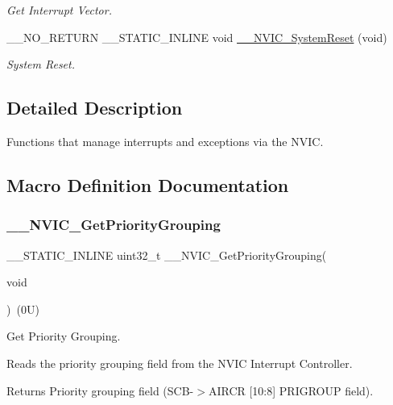 \begin{DoxyCompactItemize}
\begin{DoxyCompactList}\small\item\em Get Interrupt Vector. \end{DoxyCompactList}\item 
\+\_\+\+\_\+\+N\+O\+\_\+\+R\+E\+T\+U\+RN \+\_\+\+\_\+\+S\+T\+A\+T\+I\+C\+\_\+\+I\+N\+L\+I\+NE void \mbox{\hyperlink{group___c_m_s_i_s___core___n_v_i_c_functions_ga0d9aa2d30fa54b41eb780c16e35b676c}{\+\_\+\+\_\+\+N\+V\+I\+C\+\_\+\+System\+Reset}} (void)
\begin{DoxyCompactList}\small\item\em System Reset. \end{DoxyCompactList}\end{DoxyCompactItemize}


\subsection{Detailed Description}
Functions that manage interrupts and exceptions via the N\+V\+IC. 



\subsection{Macro Definition Documentation}
\mbox{\label{group___c_m_s_i_s___core___n_v_i_c_functions_gae1de06155d072758b3453edb07d12459}} 
\subsubsection{\texorpdfstring{\_\_NVIC\_GetPriorityGrouping}{\_\_NVIC\_GetPriorityGrouping}}
{\footnotesize\ttfamily \+\_\+\+\_\+\+S\+T\+A\+T\+I\+C\+\_\+\+I\+N\+L\+I\+NE uint32\+\_\+t \+\_\+\+\_\+\+N\+V\+I\+C\+\_\+\+Get\+Priority\+Grouping(\begin{DoxyParamCaption}\item[{}]{void }\end{DoxyParamCaption})~(0\+U)}



Get Priority Grouping. 

Reads the priority grouping field from the N\+V\+IC Interrupt Controller. \begin{DoxyReturn}{Returns}
Priority grouping field (S\+C\+B-\/$>$A\+I\+R\+CR \mbox{[}10\+:8\mbox{]} P\+R\+I\+G\+R\+O\+UP field). 
\end{DoxyReturn}


